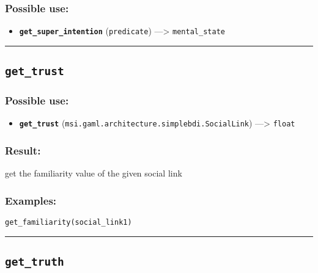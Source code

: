 \documentclass[]{book}
\providecommand{\tightlist}{%
  \setlength{\itemsep}{0pt}\setlength{\parskip}{0pt}}
\theoremstyle{definition}
\theoremstyle{definition}
\theoremstyle{definition}
\theoremstyle{remark}
\begin{document}
\subsubsection{Possible use:}\label{possible-use-229}

\begin{itemize}
\tightlist
\item
  \textbf{\texttt{get\_super\_intention}} (\texttt{predicate})
  ---\textgreater{} \texttt{mental\_state}
\end{itemize}

\begin{center}\rule{0.5\linewidth}{\linethickness}\end{center}

\subsection{\texorpdfstring{\texttt{get\_trust}}{get\_trust}}\label{get_trust}

\subsubsection{Possible use:}\label{possible-use-230}

\begin{itemize}
\tightlist
\item
  \textbf{\texttt{get\_trust}}
  (\texttt{msi.gaml.architecture.simplebdi.SocialLink})
  ---\textgreater{} \texttt{float}
\end{itemize}

\subsubsection{Result:}\label{result-223}

get the familiarity value of the given social link

\subsubsection{Examples:}\label{examples-176}

\begin{verbatim}
get_familiarity(social_link1) 
\end{verbatim}

\begin{center}\rule{0.5\linewidth}{\linethickness}\end{center}

\subsection{\texorpdfstring{\texttt{get\_truth}}{get\_truth}}\label{get_truth}
\end{document}
